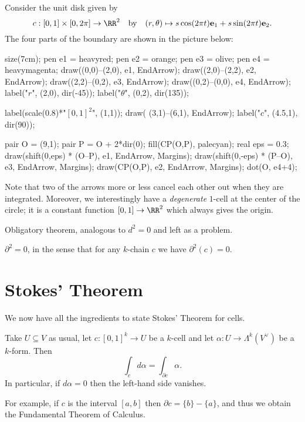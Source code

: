 \begin{example}
	Consider the unit disk given by
	\[ c : [0,1] \times [0,2\pi] \to \RR^2 \quad\text{by}\quad
	(r,\theta) \mapsto s\cos(2\pi t)\ee_1 + s\sin(2\pi t)\ee_2. \]
	The four parts of the boundary are shown in the picture below:
	\begin{center}
		\begin{asy}
			size(7cm);
			pen e1 = heavyred;
			pen e2 = orange;
			pen e3 = olive;
			pen e4 = heavymagenta;
			draw((0,0)--(2,0), e1, EndArrow);
			draw((2,0)--(2,2), e2, EndArrow);
			draw((2,2)--(0,2), e3, EndArrow);
			draw((0,2)--(0,0), e4, EndArrow);
			label("$r$", (2,0), dir(-45));
			label("$\theta$", (0,2), dir(135));

			label(scale(0.8)*"$[0,1]^2$", (1,1));
			draw( (3,1)--(6,1), EndArrow);
			label("$c$", (4.5,1), dir(90));

			pair O = (9,1);
			pair P = O + 2*dir(0);
			fill(CP(O,P), palecyan);
			real eps = 0.3;
			draw(shift(0,eps) * (O--P), e1, EndArrow, Margins);
			draw(shift(0,-eps) * (P--O), e3, EndArrow, Margins);
			draw(CP(O,P), e2, EndArrow, Margins);
			dot(O, e4+4);
		\end{asy}
	\end{center}
	Note that two of the arrows more or less cancel each other out when they are integrated.
	Moreover, we interestingly have a \emph{degenerate} $1$-cell at the center of the circle;
	it is a constant function $[0,1] \to \RR^2$ which always gives the origin.
\end{example}

Obligatory theorem, analogous to $d^2=0$ and left as a problem.
\begin{theorem}
	$\partial^2 = 0$, in the sense that for any $k$-chain $c$ we have $\partial^2(c) = 0$.
\end{theorem}

\section{Stokes' Theorem}

We now have all the ingredients to state Stokes' Theorem for cells.
\begin{theorem}
	Take $U \subseteq V$ as usual, let $c : [0,1]^k \to U$ be a $k$-cell
	and let $\alpha : U \to \Lambda^k(V^\vee)$ be a $k$-form.
	Then
	\[ \int_c d\alpha = \int_{\partial c} \alpha. \]
	In particular, if $d\alpha = 0$ then the left-hand side vanishes.
\end{theorem}
For example, if $c$ is the interval $[a,b]$ then $\partial c = \{b\} - \{a\}$,
and thus we obtain the Fundamental Theorem of Calculus.

